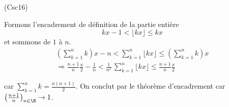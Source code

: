 \begin{tiny}(Csc16)\end{tiny} Formons l'encadrement de définition de la partie entière
\[
  kx - 1 < \lfloor kx \rfloor \leq kx
\]
et sommons de $1$ à $n$.
\begin{multline*}
  \left( \sum_{k=1}^{n} k\right) x - n < \sum_{k=1}^{n} \lfloor kx \rfloor 
  \leq \left( \sum_{k=1}^{n} k\right) x \\
  \Rightarrow
  \frac{n+1}{n} \frac{x}{2} - \frac{1}{n} < \frac{1}{n^2}\,\sum_{k=1}^{n} \lfloor kx \rfloor \leq \frac{n+1}{n} \frac{x}{2}
\end{multline*}

car $\sum_{k=1}^{n} k = \frac{n(n+1)}{2}$. On conclut par le théorème d'encadrement car $\left( \frac{n+1}{n}\right)_{n\in \N}\rightarrow 1$.
